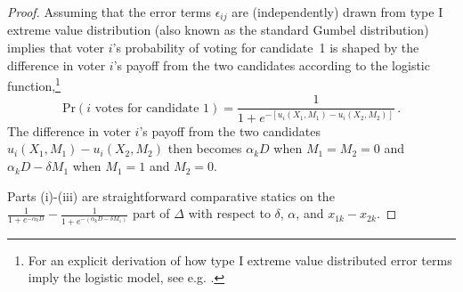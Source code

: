 \documentclass[12pt]{article}
\begin{document}
\begin{proof}
Assuming that the error terms $\epsilon_{ij}$ are (independently) drawn from type I extreme value distribution (also known as the standard Gumbel distribution) implies that voter $i$'s probability of voting for candidate~1 is shaped by the difference in voter $i$'s payoff from the two candidates according to the logistic function,\footnote{For an explicit derivation of how type I extreme value distributed error terms imply the logistic model, see e.g. \citet[476-478, 486-487]{Cameron2005}.}
\begin{equation*}
\text{Pr}(i \text{ votes for candidate~1}) = \frac{1}{1+e^{-[u_i(X_1, M_1)-u_i(X_2, M_2)]}} \, .
\end{equation*}
The difference in voter $i$'s payoff from the two candidates $u_i(X_1, M_1)-u_i(X_2, M_2)$ then becomes $\alpha_k D$ when $M_1=M_2=0$ and $\alpha_k D - \delta M_1$ when $M_1=1$ and $M_2=0$.

Parts (i)-(iii) are straightforward comparative statics on the $\frac{1}{1+e^{-\alpha_k D}}-\frac{1}{1+e^{-(\alpha_k D - \delta M_1)}}$ part of $\Delta$ with respect to $\delta$, $\alpha$, and $x_{1k} - x_{2k}$.


\end{proof}
\end{document}
